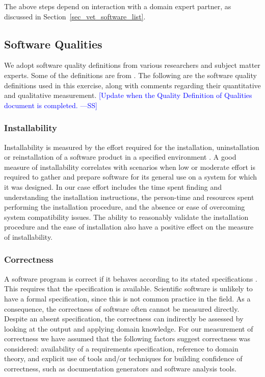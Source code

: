 \documentclass[final, 3p, times, authoryear]{elsarticle}
\newcommand{\authornote}[3]{\textcolor{#1}{[#3 ---#2]}}
\newcommand{\authornote}[3]{}
\newcommand{\wss}[1]{\authornote{blue}{SS}{#1}} %
\begin{document}
The above steps depend on interaction with a domain expert partner, as discussed
in Section~\ref{sec_vet_software_list}.

\subsection{Software Qualities} \label{softwarequalities}

We adopt software quality definitions from various researchers and subject
matter experts. Some of the definitions are from \cite{Smithetal2020}. The
following are the software quality definitions used in this exercise, along with
comments regarding their quantitative and qualitative measurement.  \wss{Update
when the Quality Definition of Qualities document is completed.}

\subsubsection{Installability}

Installability is measured by the effort required for the installation,
uninstallation or reinstallation of a software product in a specified
environment \citep{ISO/IEC25010, lenhard2013measuring}. A good measure of
installability correlates with scenarios when low or moderate effort is required
to gather and prepare software for its general use on a system for which it was
designed. In our case effort includes the time spent finding and understanding
the installation instructions, the person-time and resources spent performing
the installation procedure, and the absence or ease of overcoming system
compatibility issues. The ability to reasonably validate the installation
procedure and the ease of installation also have a positive effect on the
measure of installability.

\subsubsection{Correctness}

A software program is correct if it behaves according to its stated
specifications \citep{GhezziEtAl2003}. This requires that the specification is
available. Scientific software is unlikely to have a formal specification, since
this is not common practice in the field. As a consequence, the correctness of
software often cannot be measured directly. Despite an absent specification, the
correctness can indirectly be assessed by looking at the output and applying
domain knowledge. For our measurement of correctness we have assumed that the
following factors suggest correctness was considered: availability of a
requirements specification, reference to domain theory, and explicit use of
tools and/or techniques for building confidence of correctness, such as
documentation generators and software analysis tools.
\end{document}
